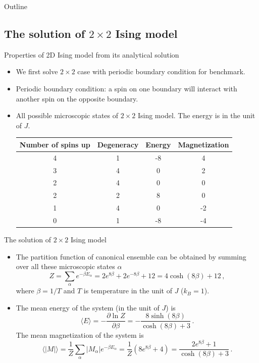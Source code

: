 \documentclass{beamer}
\begin{document}
\begin{frame}{Outline}
\tableofcontents[currentsection]
\end{frame}

\subsection{The solution of $2 \times 2$ Ising model}
\begin{frame}{Properties of 2D Ising model from its analytical solution}
\begin{itemize}
	\item<1-> We first solve $2 \times 2$ case with periodic boundary condition for benchmark. 
	\item<2-> Periodic boundary condition: a spin on one boundary will interact with another spin on the opposite boundary. 
	\item<3-> All possible microscopic states of $2 \times 2$ Ising model. The energy is in the unit of $J$. 
	\begin{table}
		\centering
		\begin{tabular}{cccc}
			\hline
			\hline 
			Number of spins up & Degeneracy & Energy & Magnetization \\ 
			\hline
			4 & 1 & -8 & 4 \\  
			3 & 4 & 0 & 2 \\ 
			2 & 4 & 0 & 0 \\ 
			2 & 2 & 8 & 0 \\ 
			1 & 4 & 0 & -2 \\ 
			0 & 1 & -8 & -4 \\ 
			\hline 
			\hline
		\end{tabular}
		\label{tab:2times2} 
	\end{table}
\end{itemize}
\end{frame}

\begin{frame}{The solution of $2 \times 2$ Ising model}
\begin{itemize}
	\item<1-> The partition function of canonical ensemble can be obtained by summing over all these microscopic states $\alpha$ 
	\begin{equation}
	Z=\sum_{\alpha}e^{-\beta E_\alpha}=2e^{8\beta}+2e^{-8\beta}+12=4\cosh\left(8\beta\right)+12\,,
	\end{equation}
	where $\beta=1/T$ and $T$ is temperature in the unit of $J$ ($k_B=1$). 
	\item<2-> The mean energy of the system (in the unit of $J$) is 
	\begin{equation}
	\langle E\rangle=-\frac{\partial \ln Z}{\partial \beta}=-\frac{8\sinh\left(8\beta\right)}{\cosh\left(8\beta\right)+3}\,. 
	\end{equation}
	The mean magnetization of the system is 
	\begin{equation}
	\langle|M|\rangle=\frac{1}{Z}\sum_{\alpha} |M_\alpha| e^{-\beta E_\alpha}=\frac{1}{Z}\left(8e^{8\beta}+4\right)
	=\frac{2e^{8\beta}+1}{\cosh\left(8\beta\right)+3}\,. 
	\end{equation}
\end{itemize}
\end{frame}
\end{document}
